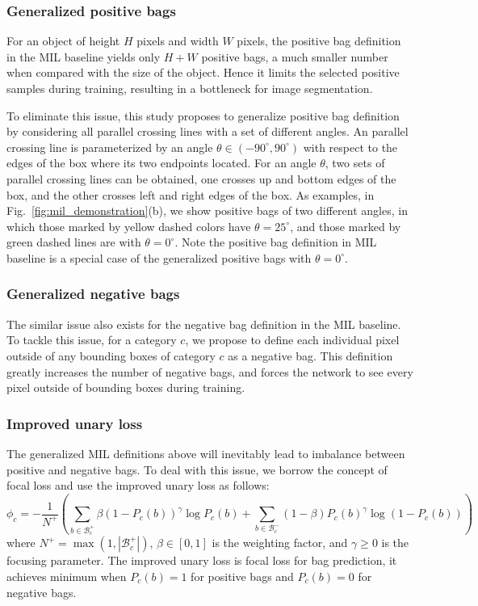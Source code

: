 \documentclass[runningheads]{llncs}
\begin{document}
\subsubsection{Generalized positive bags}
For an object of height $H$ pixels and width $W$ pixels, the positive bag definition in the MIL baseline yields only $H+W$ positive bags, a much smaller number when compared with the size of the object. Hence it limits the selected positive samples during training, resulting in a bottleneck for image segmentation.

To eliminate this issue, this study proposes to generalize positive bag definition by considering all parallel crossing lines with a set of different angles. An parallel crossing line is parameterized by an angle $\theta \in (-90^\circ, 90^\circ)$ with respect to the edges of the box where its two endpoints located. For an angle $\theta$, two sets of parallel crossing lines can be obtained, one crosses up and bottom edges of the box, and the other crosses left and right edges of the box. As examples, in Fig.~\ref{fig:mil_demonstration}(b), we show positive bags of two different angles, in which those marked by yellow dashed colors have $\theta=25^\circ$, and those marked by green dashed lines are with $\theta=0^\circ$. Note the positive bag definition in MIL baseline is a special case of the generalized positive bags with $\theta=0^\circ$.  

\subsubsection{Generalized negative bags}
The similar issue also exists for the negative bag definition in the MIL baseline. To tackle this issue, for a category $c$, we propose to define each individual pixel outside of any bounding boxes of category $c$ as a negative bag. This definition greatly increases the number of negative bags, and forces the network to see every pixel outside of bounding boxes during training. 

\subsubsection{Improved unary loss}
The generalized MIL definitions above will inevitably lead to imbalance between positive and negative bags. To deal with this issue, we borrow the concept of focal loss \cite{ross2017focal} and use the improved unary loss as follows:
\begin{equation}
\phi_c = -\frac{1}{N^+} \left( \sum_{b \in \mathcal{B}_c^+} \beta \left(1-P_c(b)\right)^\gamma \log P_c(b) +  \sum_{b \in \mathcal{B}_c^-} (1-\beta)P_c(b)^\gamma \log(1-P_c(b)) \right)
\label{equ:focal_loss}
\end{equation}
where $N^+ = \max(1, |\mathcal{B}_c^+|)$, $\beta \in [0,1]$ is the weighting factor, and $\gamma \geq 0$ is the focusing parameter. The improved unary loss is focal loss for bag prediction, it achieves minimum when $P_c(b)=1$ for positive bags and $P_c(b)=0$ for negative bags.
\end{document}
